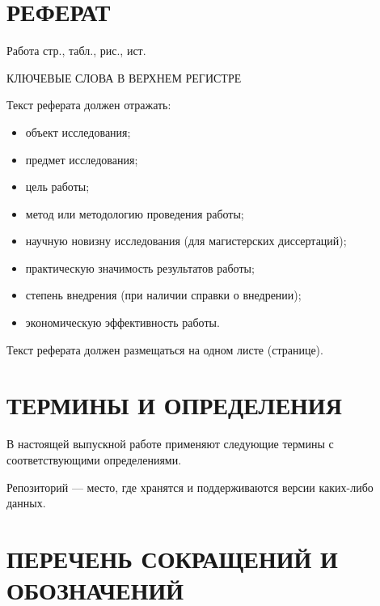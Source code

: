 \documentclass[a4paper,12pt]{article}
\begin{document}
\setcounter{page}{2}

\section*{\centering РЕФЕРАТ}


Работа  стр.,  табл.,  рис., \totalmycitecounts ист. 

КЛЮЧЕВЫЕ СЛОВА В ВЕРХНЕМ РЕГИСТРЕ

Текст реферата должен отражать:
\begin{itemize}
\item объект исследования;
\item предмет исследования;
\item цель работы;
\item метод или методологию проведения работы;
\item научную новизну исследования (для магистерских диссертаций);
\item практическую значимость результатов работы;
\item степень внедрения (при наличии справки о внедрении);
\item экономическую эффективность работы.
\end{itemize}
Текст реферата должен размещаться на одном листе (странице).

\pagebreak

\tableofcontents

\pagebreak


\section*{\centering ТЕРМИНЫ И ОПРЕДЕЛЕНИЯ}
В настоящей выпускной работе применяют следующие термины с соответствующими определениями.

Репозиторий --- место, где хранятся и поддерживаются версии каких-либо данных. 

\pagebreak

\section*{\centering ПЕРЕЧЕНЬ СОКРАЩЕНИЙ И ОБОЗНАЧЕНИЙ}
\end{document}
